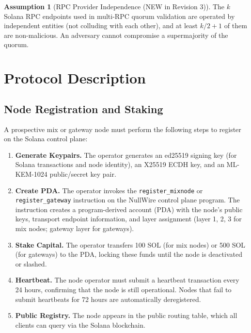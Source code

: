 \documentclass[11pt]{article}
\theoremstyle{definition}
\newtheorem{assumption}{Assumption}
\theoremstyle{remark}
\begin{document}
\begin{assumption}[RPC Provider Independence (NEW in Revision 3)]
\label{assum:rpc-indep}
The $k$ Solana RPC endpoints used in multi-RPC quorum validation are operated by independent entities (not colluding with each other), and at least $k/2 + 1$ of them are non-malicious. An adversary cannot compromise a supermajority of the quorum.
\end{assumption}

\section{Protocol Description}
\label{sec:protocol}

\subsection{Node Registration and Staking}
\label{subsec:register}

A prospective mix or gateway node must perform the following steps to register on the Solana control plane:

\begin{enumerate}
    \item \textbf{Generate Keypairs.} The operator generates an ed25519 signing key (for Solana transactions and node identity), an X25519 ECDH key, and an ML-KEM-1024 public/secret key pair.

    \item \textbf{Create PDA.} The operator invokes the \texttt{register\_mixnode} or \texttt{register\_gateway} instruction on the NullWire control plane program. The instruction creates a program-derived account (PDA) with the node's public keys, transport endpoint information, and layer assignment (layer 1, 2, 3 for mix nodes; gateway layer for gateways).

    \item \textbf{Stake Capital.} The operator transfers 100 SOL (for mix nodes) or 500 SOL (for gateways) to the PDA, locking these funds until the node is deactivated or slashed.

    \item \textbf{Heartbeat.} The node operator must submit a heartbeat transaction every 24 hours, confirming that the node is still operational. Nodes that fail to submit heartbeats for 72 hours are automatically deregistered.

    \item \textbf{Public Registry.} The node appears in the public routing table, which all clients can query via the Solana blockchain.
\end{enumerate}
\end{document}
